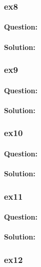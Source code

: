 \documentclass[a4paper,12pt,titlepage]{article} %
\begin{document}
\subsubsection{ex8}
\paragraph{Question:}

\paragraph{Solution:}

\subsubsection{ex9}
\paragraph{Question:}

\paragraph{Solution:}

\subsubsection{ex10}
\paragraph{Question:}

\paragraph{Solution:}

\subsubsection{ex11}
\paragraph{Question:}

\paragraph{Solution:}

\subsubsection{ex12}
\end{document}
